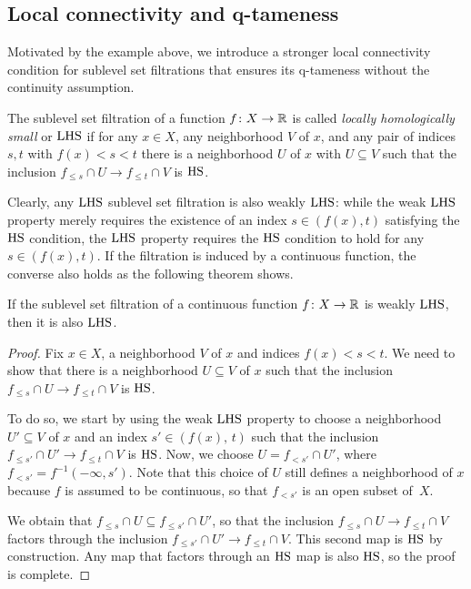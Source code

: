\subsection{Local connectivity and q-tameness}

Motivated by the example above, we introduce a stronger local connectivity condition for sublevel set filtrations that ensures its q-tameness without the continuity assumption.

\begin{defi}
	The sublevel set filtration of a function $f \colon X \to \mathbb{R}$ is called \emph{locally homologically small} or \emph{$\mathrm{LHS}$} if for any $x \in X$, any neighborhood $V$ of $x$, and any pair of indices $s,t$ with $f(x) < s < t$ there is a neighborhood $U$ of $x$ with $U \subseteq V$ such that the inclusion $f_{\leq s} \cap U \to f_{\leq t} \cap V$ is $\mathrm{HS}$.
\end{defi}

Clearly, any $\mathrm{LHS}$ sublevel set filtration is also weakly $\mathrm{LHS}$:
while the weak $\mathrm{LHS}$ property merely requires the existence of an index $s \in (f(x),t)$ satisfying the $\mathrm{HS}$ condition, the $\mathrm{LHS}$ property requires the $\mathrm{HS}$ condition to hold for any $s \in (f(x),t)$.
If the filtration is induced by a continuous function, the converse also holds as the following theorem shows.

\begin{thm} \label{t:weak hlc to hlc}
	If the sublevel set filtration of a continuous function $f \colon X \to \mathbb{R}$ is weakly $\mathrm{LHS}$, then it is also $\mathrm{LHS}$.
\end{thm}

\begin{proof}
	Fix $x \in X$, a neighborhood $V$ of $x$ and indices $f(x) < s < t$.
	We need to show that there is a neighborhood $U \subseteq V$ of $x$ such that the inclusion $f_{\leq s} \cap U \to f_{\leq t} \cap V$ is $\mathrm{HS}$.

	To do so, we start by using the weak $\mathrm{LHS}$ property to choose a neighborhood $U' \subseteq V$ of $x$ and an index $s' \in (f(x),\, t)$ such that the inclusion $f_{\leq s'} \cap U' \to f_{\leq t} \cap V$ is $\mathrm{HS}$.
	Now, we choose $U = f_{< s'} \cap U'$, where $f_{< s'} = f^{-1} (-\infty, s')$.
	Note that this choice of $U$ still defines a neighborhood of $x$ because $f$ is assumed to be continuous, so that $f_{< s'}$ is an open subset of~$X$.

	We obtain that $f_{\leq s} \cap U \subseteq f_{\leq s'} \cap U'$, so that the inclusion $f_{\leq s} \cap U \to f_{\leq t} \cap V$ factors through the inclusion $f_{\leq s'} \cap U' \to f_{\leq t} \cap V$.
	This second map is $\mathrm{HS}$ by construction.
	Any map that factors through an $\mathrm{HS}$ map is also $\mathrm{HS}$, so the proof is complete.
\end{proof}

